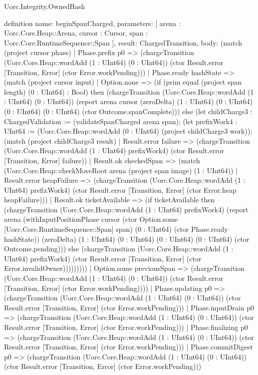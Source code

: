 \begin{lexlean}{Uorc.Integrity.OwnedHash}
\begin{semanticmodule}
definition{
  name: beginSpanCharged,
  parameters: [
    arena : Uorc.Core.Heap::Arena,
    cursor : Cursor,
    span : Uorc.Core.RuntimeSequence::Span
  ],
  result: ChargedTransition,
  body: (match (project cursor phase)
    | Phase.prefix p0 => (chargeTransition (Uorc.Core.Heap::wordAdd (1 : UInt64) (0 : UInt64)) (ctor Result.error [Transition, Error] (ctor Error.workPending)))
    | Phase.ready hashState => (match (project cursor input)
      | Option.none => (if (prim equal (project span length) (0 : UInt64) : Bool) then (chargeTransition (Uorc.Core.Heap::wordAdd (1 : UInt64) (0 : UInt64)) (report arena cursor (zeroDelta) (1 : UInt64) (0 : UInt64) (0 : UInt64) (0 : UInt64) (ctor Outcome.spanComplete))) else (let childCharge3 : ChargedValidation := (validateSpanCharged arena span); (let prefixWork4 : UInt64 := (Uorc.Core.Heap::wordAdd (0 : UInt64) (project childCharge3 work)); (match (project childCharge3 result)
        | Result.error failure => (chargeTransition (Uorc.Core.Heap::wordAdd (1 : UInt64) prefixWork4) (ctor Result.error [Transition, Error] failure))
        | Result.ok checkedSpan => (match (Uorc.Core.Heap::checkMoveRoot arena (project span image) (1 : UInt64))
          | Result.error heapFailure => (chargeTransition (Uorc.Core.Heap::wordAdd (1 : UInt64) prefixWork4) (ctor Result.error [Transition, Error] (ctor Error.heap heapFailure)))
          | Result.ok ticketAvailable => (if ticketAvailable then (chargeTransition (Uorc.Core.Heap::wordAdd (1 : UInt64) prefixWork4) (report arena (withInputPositionPhase cursor (ctor Option.some [Uorc.Core.RuntimeSequence::Span] span) (0 : UInt64) (ctor Phase.ready hashState)) (zeroDelta) (1 : UInt64) (0 : UInt64) (0 : UInt64) (0 : UInt64) (ctor Outcome.pending))) else (chargeTransition (Uorc.Core.Heap::wordAdd (1 : UInt64) prefixWork4) (ctor Result.error [Transition, Error] (ctor Error.invalidOwner)))))))))
      | Option.some previousSpan => (chargeTransition (Uorc.Core.Heap::wordAdd (1 : UInt64) (0 : UInt64)) (ctor Result.error [Transition, Error] (ctor Error.workPending))))
    | Phase.updating p0 => (chargeTransition (Uorc.Core.Heap::wordAdd (1 : UInt64) (0 : UInt64)) (ctor Result.error [Transition, Error] (ctor Error.workPending)))
    | Phase.inputDrain p0 => (chargeTransition (Uorc.Core.Heap::wordAdd (1 : UInt64) (0 : UInt64)) (ctor Result.error [Transition, Error] (ctor Error.workPending)))
    | Phase.finalizing p0 => (chargeTransition (Uorc.Core.Heap::wordAdd (1 : UInt64) (0 : UInt64)) (ctor Result.error [Transition, Error] (ctor Error.workPending)))
    | Phase.commitDigest p0 => (chargeTransition (Uorc.Core.Heap::wordAdd (1 : UInt64) (0 : UInt64)) (ctor Result.error [Transition, Error] (ctor Error.workPending)))
}
\end{semanticmodule}
\end{lexlean}
